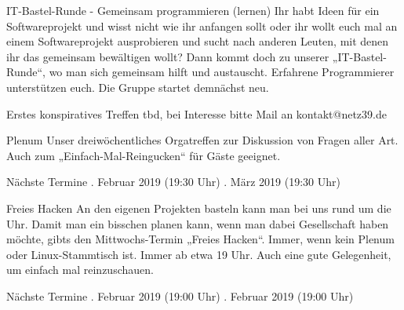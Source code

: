 \documentclass[flyer]{netz39} %
\begin{document}
\begin{entry}{IT-Bastel-Runde - Gemeinsam programmieren (lernen)}
Ihr habt Ideen für ein Softwareprojekt und wisst nicht wie ihr anfangen sollt oder ihr wollt euch mal an einem Softwareprojekt ausprobieren und sucht nach anderen Leuten, mit denen ihr das gemeinsam bewältigen wollt? Dann kommt doch zu unserer „IT-Bastel-Runde“, wo man sich gemeinsam hilft und austauscht. Erfahrene Programmierer unterstützen euch. Die Gruppe startet demnächst neu.
\begin{events}{Erstes konspiratives Treffen}
	\event tbd, bei Interesse bitte Mail an kontakt@netz39.de
\end{events}
\end{entry}

\begin{entry}{Plenum}
Unser dreiwöchentliches Orgatreffen zur Diskussion von Fragen aller Art. Auch zum „Einfach-Mal-Reingucken“ für Gäste geeignet. 
\begin{events}{Nächste Termine} 
	. Februar 2019 (19:30 Uhr)
	. März 2019 (19:30 Uhr)
\end{events}
\end{entry}

\begin{entry}{Freies Hacken}
An den eigenen Projekten basteln kann man bei uns rund um die Uhr. Damit man ein bisschen planen kann, wenn man dabei Gesellschaft haben möchte, gibts den Mittwochs-Termin „Freies Hacken“. Immer, wenn kein Plenum oder Linux-Stammtisch ist. Immer ab etwa 19 Uhr. Auch eine gute Gelegenheit, um einfach mal reinzuschauen.
\begin{events}{Nächste Termine} 
	. Februar 2019 (19:00 Uhr)
	. Februar 2019 (19:00 Uhr)
\end{events}
\end{entry}



\end{document}
